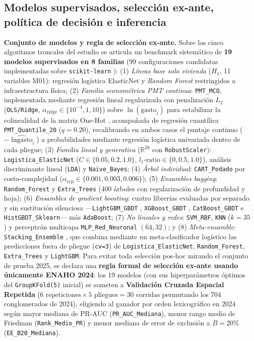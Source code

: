 \subsection{Modelos supervisados, selección ex-ante, política de decisión e inferencia}

\textbf{Conjunto de modelos y regla de selección ex-ante.} Sobre los cinco algoritmos troncales del estudio se articula un benchmark sistemático de \textbf{19 modelos supervisados en 8 familias} (99 configuraciones candidatas implementadas sobre \texttt{scikit-learn} \cite{pedregosa2011scikit}): (1) \textit{Líneas base solo vivienda} ($H_1$, 11 variables M01): regresión logística ElasticNet y \textit{Random Forest} restringidos a infraestructura física; (2) \textit{Familia econométrica PMT continua}: \texttt{PMT\_MCO}, implementada mediante regresión lineal regularizada con penalización $L_2$ (\texttt{OLS/Ridge}, $\alpha_{\text{ridge}} \in \{10^{-4}, 1, 10\}$) sobre $\ln(\text{gasto}_i)$ para estabilizar la colinealidad de la matriz One-Hot \cite{brown2018poor,mcbride2018retooling}, acompañada de regresión cuantílica \texttt{PMT\_Quantile\_20} ($q=0.20$), recalibrando en ambos casos el puntaje continuo ($-\widehat{\ln\text{gasto}}_i$) a probabilidades mediante regresión logística univariada dentro de cada pliegue; (3) \textit{Familia lineal y generativa} ($\mathbb{R}^{28}$ con \texttt{RobustScaler}): \texttt{Logistica\_ElasticNet} ($C \in \{0.05, 0.2, 1.0\}$, $l_1\text{-ratio} \in \{0, 0.5, 1.0\}$), análisis discriminante lineal (\texttt{LDA}) y \texttt{Naive\_Bayes}; (4) \textit{Árbol individual}: \texttt{CART\_Podado} por costo-complejidad ($\alpha_{\text{ccp}} \in \{0.001, 0.003, 0.006\}$); (5) \textit{Ensambles bagging}: \texttt{Random\_Forest} y \texttt{Extra\_Trees} (400 árboles con regularización de profundidad y hoja); (6) \textit{Ensambles de gradient boosting}: cuatro librerías evaluadas por separado y sin sustitución silenciosa ---\texttt{LightGBM\_GBDT} \cite{ke2017lightgbm}, \texttt{XGBoost\_GBDT} \cite{chen2016xgboost}, \texttt{CatBoost\_GBDT} \cite{prokhorenkova2018catboost} e \texttt{HistGBDT\_Sklearn}--- más \texttt{AdaBoost}; (7) \textit{No lineales y redes}: \texttt{SVM\_RBF}, \texttt{KNN} ($k=35$) y perceptrón multicapa \texttt{MLP\_Red\_Neuronal} $(64, 32)$; y (8) \textit{Meta-ensamble}: \texttt{Stacking\_Ensemble} \cite{wolpert1992stacked}, que combina mediante un meta-clasificador logístico las predicciones fuera de pliegue (\texttt{cv=3}) de \texttt{Logistica\_ElasticNet}, \texttt{Random\_Forest}, \texttt{Extra\_Trees} y \texttt{LightGBM}. Para evitar toda selección pos-hoc mirando el conjunto de prueba 2025, se declara una \textbf{regla formal de selección ex-ante usando únicamente ENAHO 2024}: los 19 modelos (con sus hiperparámetros óptimos del \texttt{GroupKFold(5)} inicial) se someten a \textbf{Validación Cruzada Espacial Repetida} ($6\text{ repeticiones} \times 5\text{ pliegues} = 30\text{ corridas}$ permutando los 704 conglomerados de 2024), eligiendo al ganador por orden lexicográfico en 2024 según mayor mediana de PR-AUC (\texttt{PR\_AUC\_Mediana}), menor rango medio de Friedman (\texttt{Rank\_Medio\_PR}) y menor mediana de error de exclusión a $B=20\%$ (\texttt{EE\_B20\_Mediana}).

